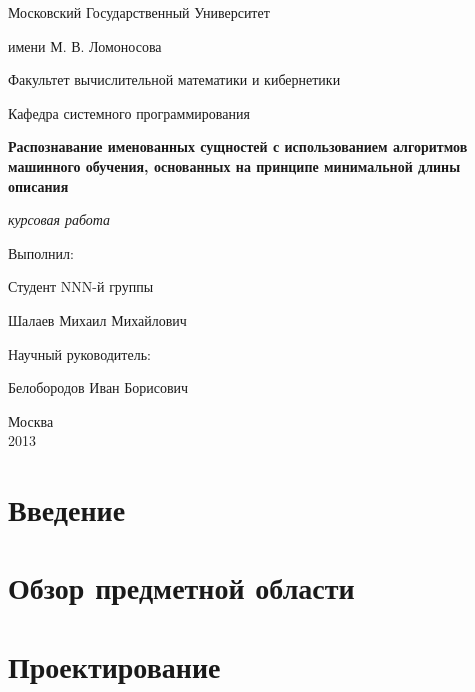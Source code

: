 \documentclass[12pt,a4paper]{article}
\begin{document}
\setlength{\parskip}{.5\baselineskip}

\thispagestyle{empty}

\begin{center}

Московский Государственный Университет

имени М. В. Ломоносова

Факультет вычислительной математики и кибернетики

Кафедра системного программирования

\vfill
\vfill

\Large
\textbf{
Распознавание именованных сущностей \linebreak
с использованием алгоритмов машинного обучения, \linebreak
основанных на принципе минимальной длины описания
}

\large
\hspace{0pt}
\linebreak
\textit{курсовая работа}
\normalsize

\vfill
\vfill

\begin{flushright}
Выполнил:

Студент NNN-й группы

Шалаев Михаил Михайлович

\hspace{0pt}

Научный руководитель:

Белобородов Иван Борисович
\end{flushright}

\vfill

Москва \\
2013
\end{center}

\clearpage
\tableofcontents

\clearpage
\section{Введение}

\clearpage
\section{Обзор предметной области}

\clearpage
\section{Проектирование}
\end{document}
